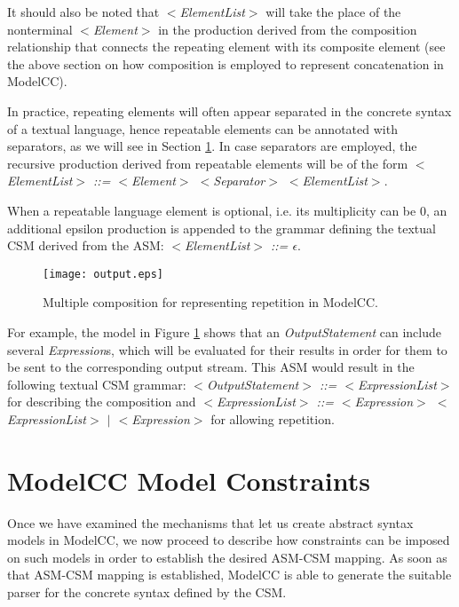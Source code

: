 \documentclass[preprint]{elsarticle}
\newcommand{\etexttt}[1]{\textit{#1}}
\begin{document}
It should also be noted that \etexttt{$<$ElementList$>$} will take the place of the nonterminal \etexttt{$<$Element$>$} in the production derived from the composition relationship that connects the repeating element with its composite element (see the above section on how composition is employed to represent concatenation in ModelCC).

In practice, repeating elements will often appear separated in the concrete syntax of a textual language, hence repeatable elements can be annotated with separators, as we will see in Section \ref{sec:modelconstraints}.
In case separators are employed, the recursive production derived from repeatable elements will be of the form \etexttt{$<$ElementList$>$ ::= $<$Element$>$ $<$Separator$>$ $<$ElementList$>$}.

When a repeatable language element is optional, i.e. its multiplicity can be $0$, an additional epsilon production is appended to the grammar defining the textual CSM derived from the ASM: \etexttt{$<$ElementList$>$ ::= $\epsilon$}.

\begin{figure}[tb!]
\centering
\texttt{[image: output.eps]}
\caption{Multiple composition for representing repetition in ModelCC.} \label{fig:output}
\end{figure}

For example, the model in Figure \ref{fig:output} shows that an \emph{OutputStatement} can include several \emph{Expression}s, which will be evaluated for their results in order for them to be sent to the corresponding output stream.
This ASM would result in the following textual CSM grammar: \etexttt{$<$OutputStatement$>$ ::= $<$ExpressionList$>$} for describing the composition and \etexttt{$<$ExpressionList$>$ ::= $<$Expression$>$ $<$ExpressionList$>$ $|$ $<$Expression$>$} for allowing repetition.

\section{ModelCC Model Constraints} \label{sec:modelconstraints}

Once we have examined the mechanisms that let us create abstract syntax models in ModelCC, we now proceed to describe how constraints can be imposed on such models in order to establish the desired ASM-CSM mapping.
As soon as that ASM-CSM mapping is established, ModelCC is able to generate the suitable parser for the concrete syntax defined by the CSM.
\end{document}
